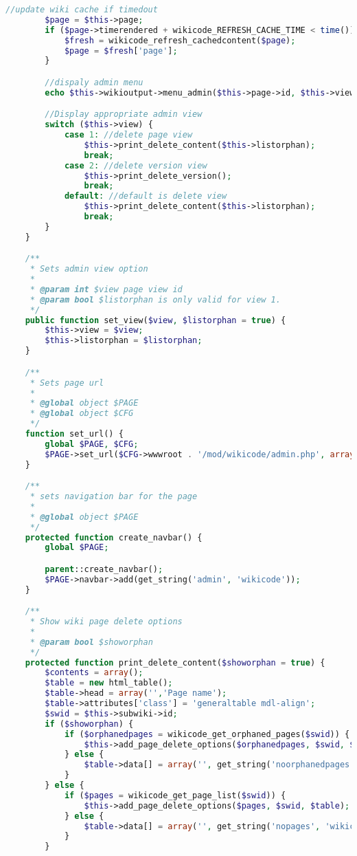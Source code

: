 \begin{lstlisting}[language=PHP]
        //update wiki cache if timedout
        $page = $this->page;
        if ($page->timerendered + wikicode_REFRESH_CACHE_TIME < time()) {
            $fresh = wikicode_refresh_cachedcontent($page);
            $page = $fresh['page'];
        }

        //dispaly admin menu
        echo $this->wikioutput->menu_admin($this->page->id, $this->view);

        //Display appropriate admin view
        switch ($this->view) {
            case 1: //delete page view
                $this->print_delete_content($this->listorphan);
                break;
            case 2: //delete version view
                $this->print_delete_version();
                break;
            default: //default is delete view
                $this->print_delete_content($this->listorphan);
                break;
        }
    }

    /**
     * Sets admin view option
     *
     * @param int $view page view id
     * @param bool $listorphan is only valid for view 1.
     */
    public function set_view($view, $listorphan = true) {
        $this->view = $view;
        $this->listorphan = $listorphan;
    }

    /**
     * Sets page url
     *
     * @global object $PAGE
     * @global object $CFG
     */
    function set_url() {
        global $PAGE, $CFG;
        $PAGE->set_url($CFG->wwwroot . '/mod/wikicode/admin.php', array('pageid' => $this->page->id));
    }

    /**
     * sets navigation bar for the page
     *
     * @global object $PAGE
     */
    protected function create_navbar() {
        global $PAGE;

        parent::create_navbar();
        $PAGE->navbar->add(get_string('admin', 'wikicode'));
    }

    /**
     * Show wiki page delete options
     *
     * @param bool $showorphan
     */
    protected function print_delete_content($showorphan = true) {
        $contents = array();
        $table = new html_table();
        $table->head = array('','Page name');
        $table->attributes['class'] = 'generaltable mdl-align';
        $swid = $this->subwiki->id;
        if ($showorphan) {
            if ($orphanedpages = wikicode_get_orphaned_pages($swid)) {
                $this->add_page_delete_options($orphanedpages, $swid, $table);
            } else {
                $table->data[] = array('', get_string('noorphanedpages', 'wikicode'));
            }
        } else {
            if ($pages = wikicode_get_page_list($swid)) {
                $this->add_page_delete_options($pages, $swid, $table);
            } else {
                $table->data[] = array('', get_string('nopages', 'wikicode'));
            }
        }


\end{lstlisting}
